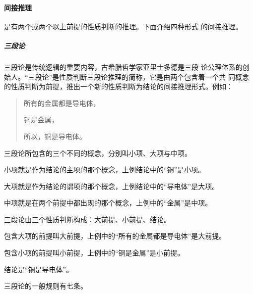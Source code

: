 \documentclass[final,oneside]{ctexbook}
\newenvironment{equotation}{\begin{quotation}\kaishu}{\end{quotation}}
\begin{document}
\paragraph{间接推理}是有两个或两个以上前提的性质判断的推理。下面介绍四种形式
的间接推理。

\subparagraph{三段论} 三段论是传统逻辑的重要内容，古希腊哲学家亚里士多德是三段
论公理体系的创始人。“三段论”是性质判断三段论推理的简称，它是由两个包含着一个共
同概念的性质判断为前提，推出一个新的性质判断为结论的间接推理形式。例如：
\begin{equotation}
  所有的金属都是导电体，

  铜是金属，

  所以，铜是导电体。
\end{equotation}

  
三段论所包含的三个不同的概念，分别叫小项、大项与中项。

小项就是作为结论的主项的那个概念，上例结论中的“铜”是小项。

大项就是作为结论的谓项的那个概念，上例结论中的“导电体”是大项。

中项就是在两个前提中都出现的那个概念，上例中的“金属”是中项。

  
三段论由三个性质判断构成：大前提、小前提、结论。

包含大项的前提叫大前提，上例中的“所有的金属都是导电体”是大前提。

包含小项的前提叫小前提，上例中的“铜是金属”是小前提。

结论是“铜是导电体”。

三段论的一般规则有七条。
\end{document}
